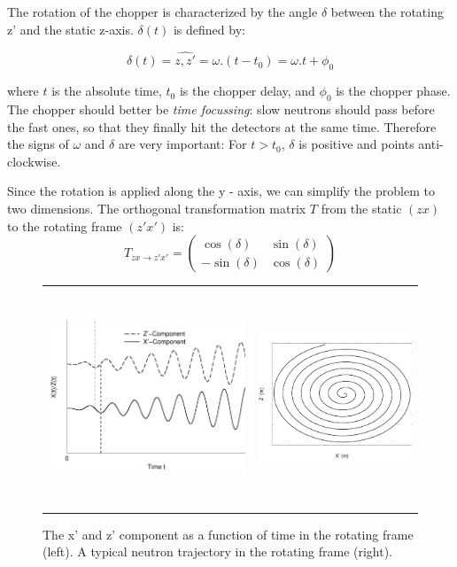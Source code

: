 The rotation of the chopper is characterized by the angle $\delta$ between the rotating z' and the static z-axis. $\delta(t)$ is defined by:

$$\delta(t) = \widehat{z,z'} = \omega.(t-t_0) = \omega.t+\phi_0$$

where $t$ is the absolute time, $t_0$ is the chopper delay, and $\phi_0$ is the chopper phase. The chopper should better be \emph{time focussing}: slow neutrons should pass before the fast ones, so that they finally hit the detectors at the same time. Therefore the signs of $\omega$ and $\delta$ are very important: For $t>t_0$, $\delta$ is positive and points anti-clockwise.

Since the rotation is applied along the y - axis, we can simplify the problem to two dimensions. The orthogonal transformation matrix $T$ from the static $(zx)$ to the rotating frame $(z'x')$ is:
\begin{equation}
T_{zx \rightarrow z'x'} = \left(
\begin{array}{cc}
\cos(\delta) & \sin (\delta) \\
-\sin(\delta) & \cos(\delta)
\end{array}
\right)
\end{equation}

\begin{figure}
\begin{center}
\begin{tabular}{cc}
\includegraphics[height=5.5cm]{./figures/XZCoords}
&
\includegraphics[height=6.5cm,width=5.5cm]{./figures/XZplain}
\end{tabular}
\end{center}
\caption{The x' and z' component as a function of time in the rotating frame (left). A typical neutron trajectory in the rotating frame (right).}
\label{fig:Component}
\end{figure}


